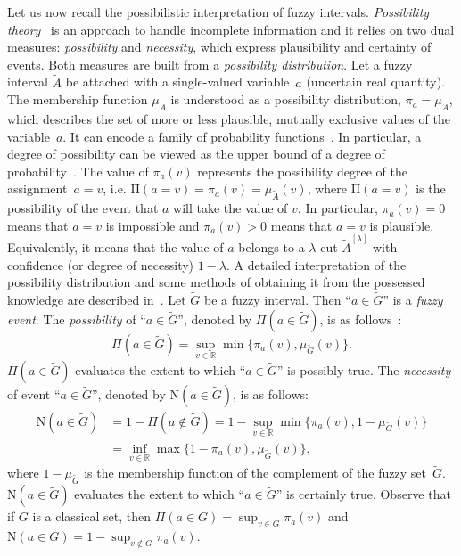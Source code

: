 \documentclass[11pt]{article}
\newcommand{\Rset}{\mathbb{R}}
\begin{document}
Let us now recall the possibilistic interpretation of fuzzy intervals.
\emph{Possibility theory}~\cite{DP88} is an approach to handle  incomplete
information and it
relies on two dual measures: \emph{possibility} and
\emph{necessity}, which express plausibility and certainty of events.
 Both measures
are built from a \emph{possibility distribution}. 
Let a fuzzy interval $\widetilde{A}$ be attached with 
a single-valued variable~$a$ (uncertain real quantity). 
The membership function $\mu_{\widetilde{A}}$ is understood as
a possibility distribution, $\pi_{a}=\mu_{\widetilde{A}}$, which 
describes the set of more or less plausible,
mutually exclusive values of the variable~$a$. 
It  can encode a family of probability functions~\cite{DP92}. In particular, a degree of possibility can be viewed as
the upper bound of a degree of probability~\cite{DP92}.
The value of $\pi_{a}(v)$  represents the possibility degree of the assignment~$a=v$, i.e.
$\mathrm{\Pi}(a=v)=
\pi_{a}(v)=\mu_{\widetilde{A}}(v)$,
 where $\mathrm{\Pi}(a=v)$ is the possibility of the event that 
 $a$ will take the value of $v$.
In particular, $\pi_{a}(v)=0$ 
means that $a=v$ is impossible 
and $\pi_{a}(v)>0$ means that $a=v$ is plausible. 
Equivalently,
 it means that the value of $a$ 
belongs to a $\lambda$-cut $\widetilde{A}^{[\lambda]}$ with
confidence (or degree of necessity) $1-\lambda$.
A detailed interpretation of the possibility distribution and some methods of obtaining it from the possessed knowledge are described in~\cite{DP88,DP94}. 
Let $\widetilde{G}$ be a fuzzy interval. Then ``$a\in \widetilde{G}$''
is a \emph{fuzzy event}.
The \emph{possibility} of ``$a \in \widetilde{G}$'', 
denoted by $\Pi(a\in \widetilde{G})$, is
as follows~\cite{DFF03}: 
\begin{equation}
\Pi(a \in \widetilde{G})=\sup_{v\in \Rset}\min\{\pi_{a}(v),\mu_{\widetilde{G}}(v)\}.
\label{dposs}
\end{equation}
$\Pi(a \in \widetilde{G})$ evaluates the extent to which  
``$a \in \widetilde{G}$''  is possibly true. 
The \emph{necessity}   of  event
``$a \in \widetilde{G}$'', denoted by 
$\mathrm{N}(a\in \widetilde{G})$, is
as follows: 
\begin{align}
\mathrm{N}(a \in \widetilde{G})&=1-\Pi(a\not\in \widetilde{G})
=1-\sup_{v\in \Rset}\min\{\pi_{a}(v),1-\mu_{\widetilde{G}}(v)\}\label{dnec}\\
&=\inf_{v\in\Rset}\max\{1-\pi_{a}(v),\mu_{\widetilde{G}}(v)\},\nonumber
\end{align}
where $1-\mu_{\widetilde{G}}$ is the membership function
of the complement of the fuzzy set~$\widetilde{G}$. 
$\mathrm{N}(a \in \widetilde{G})$ evaluates the extent to which  
``$a \in \widetilde{G}$'' is certainly true. Observe that if $G$ is a classical set, then $\Pi(a\in G)=\sup_{v\in G} \pi_{a}(v)$ and $\mathrm{N}(a\in G)=1-\sup_{v\notin G}\pi_{a}(v)$.
\end{document}
